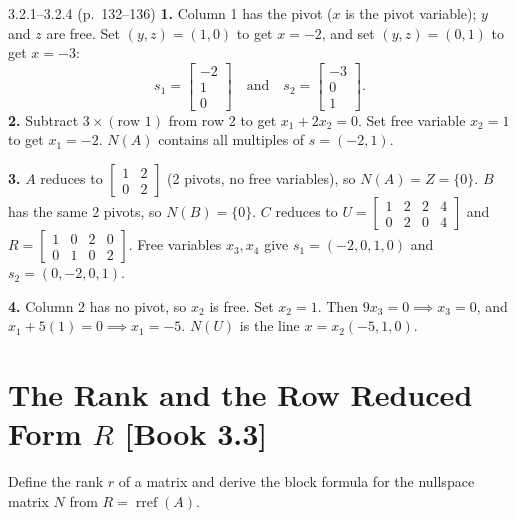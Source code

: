\documentclass[11pt,a4paper,openany,oneside]{book}
\def\vect#1{#1}%
\def\mathbf#1{#1}%
\def\bk#1{ [Book #1]}%
\newcommand{\vect}[1]{\mathbf{#1}}
\numberwithin{equation}{chapter}
\newcommand{\bk}[1]{\texorpdfstring{\enspace{\normalfont\small\color{slate}[Book #1]}}{ [Book #1]}}
\begin{document}
\vfill
\begin{pageend_sol}{3.2.1--3.2.4 (p.\ 132--136)}
\textbf{1.} Column 1 has the pivot ($x$ is the pivot variable); $y$ and $z$ are free. Set $(y,z)=(1,0)$ to get $x=-2$, and set $(y,z)=(0,1)$ to get $x=-3$:
\[
\vect{s}_1 = \begin{bmatrix}-2\\1\\0\end{bmatrix} \quad \text{and} \quad \vect{s}_2 = \begin{bmatrix}-3\\0\\1\end{bmatrix}.
\]
\textbf{2.} Subtract $3\times(\text{row 1})$ from row 2 to get $x_1 + 2x_2 = 0$. Set free variable $x_2=1$ to get $x_1=-2$. $N(A)$ contains all multiples of $\vect{s} = (-2,1)$.

\textbf{3.} $A$ reduces to $\begin{bmatrix}1 & 2\\0 & 2\end{bmatrix}$ (2 pivots, no free variables), so $N(A) = \mathbf{Z} = \{\vect{0}\}$. $B$ has the same 2 pivots, so $N(B) = \{\vect{0}\}$. $C$ reduces to $U = \begin{bmatrix}1 & 2 & 2 & 4\\0 & 2 & 0 & 4\end{bmatrix}$ and $R = \begin{bmatrix}1 & 0 & 2 & 0\\0 & 1 & 0 & 2\end{bmatrix}$. Free variables $x_3, x_4$ give $\vect{s}_1 = (-2,0,1,0)$ and $\vect{s}_2 = (0,-2,0,1)$.

\textbf{4.} Column 2 has no pivot, so $x_2$ is free. Set $x_2=1$. Then $9x_3=0 \implies x_3=0$, and $x_1+5(1)=0 \implies x_1=-5$. $N(U)$ is the line $\vect{x} = x_2(-5,1,0)$.
\end{pageend_sol}
\clearpage

\section{The Rank and the Row Reduced Form $R$\bk{3.3}}

\begin{goal}
Define the rank $r$ of a matrix and derive the block formula for the nullspace matrix $N$ from $R = \operatorname{rref}(A)$.
\end{goal}
\end{document}
